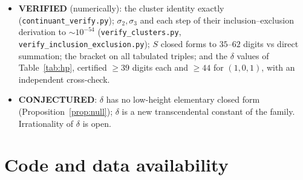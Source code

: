 \documentclass[11pt]{article}
\begin{document}
\begin{itemize}
$\sigma_2,\sigma_3$ is Appendix~\ref{app:clusters}, now machine-checked). Mathlib does
provide Newton's identities (\texttt{MvPolynomial.NewtonIdentities}); the residual
work is not the identity but the bridge from the concrete window \texttt{Finset} sums
$e_k,p_k$ in the variables $u_i$ to Mathlib's \texttt{esymm}/\texttt{psum} formalism,
which we defer to a later revision.
\item \textbf{VERIFIED} (numerically): the cluster identity exactly
(\texttt{continuant\_verify.py}); $\sigma_2,\sigma_3$ and each step of their
inclusion--exclusion derivation to $\sim10^{-54}$ (\texttt{verify\_clusters.py},
\texttt{verify\_inclusion\_exclusion.py}); $S$ closed forms to $35$--$62$ digits vs direct
summation; the bracket on all tabulated triples; and the $\delta$ values of
Table~\ref{tab:hp}, certified $\ge39$ digits each and $\ge44$ for $(1,0,1)$, with an
independent cross-check.
\item \textbf{CONJECTURED}: $\delta$ has no low-height elementary closed form
(Proposition~\ref{prop:null}); $\delta$ is a new transcendental constant of the
family. Irrationality of $\delta$ is open.
\end{itemize}

\section{Code and data availability}\label{sec:code}
\end{document}
